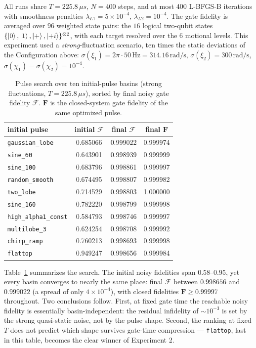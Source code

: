 \documentclass{simple-notes}
\newcommand{\closef}{\mathbf{F}}
\newcommand{\openf}{\mathcal{F}}
\begin{document}
All runs share $T = 225.8\,\mu s$, $N = 400$ steps, and at most $400$ L-BFGS-B iterations with smoothness penalties $\lambda_{L1} = 5\times 10^{-4}$, $\lambda_{L2} = 10^{-4}$. The gate fidelity is averaged over $96$ weighted state pairs: the $16$ logical two-qubit states $\{\ket 0, \ket 1, \ket +, \ket{+i}\}^{\otimes 2}$, with each target resolved over the $6$ motional levels. This experiment used a \emph{strong}-fluctuation scenario, ten times the static deviations of the Configuration above: $\sigma(\xi_1) = 2\pi\cdot 50\,\mathrm{Hz} = 314.16\,\mathrm{rad/s}$, $\sigma(\xi_2) = 300\,\mathrm{rad/s}$, $\sigma(\chi_1)=\sigma(\chi_2)=10^{-4}$.

\begin{table}[htbp]
    \centering
    \begin{tabular}{lccc}
        \hline
        initial pulse & initial $\openf$ & final $\openf$ & final $\closef$ \\
        \hline
        \texttt{gaussian\_lobe}     & 0.685066 & 0.999022 & 0.999974 \\
        \texttt{sine\_60}           & 0.643901 & 0.998939 & 0.999999 \\
        \texttt{sine\_100}          & 0.683796 & 0.998861 & 0.999997 \\
        \texttt{random\_smooth}     & 0.674495 & 0.998807 & 0.999982 \\
        \texttt{two\_lobe}          & 0.714529 & 0.998803 & 1.000000 \\
        \texttt{sine\_160}          & 0.782220 & 0.998799 & 0.999998 \\
        \texttt{high\_alpha1\_const}& 0.584793 & 0.998746 & 0.999997 \\
        \texttt{multilobe\_3}       & 0.624254 & 0.998708 & 0.999992 \\
        \texttt{chirp\_ramp}        & 0.760213 & 0.998693 & 0.999998 \\
        \texttt{flattop}            & 0.949247 & 0.998656 & 0.999984 \\
        \hline
    \end{tabular}
    \caption{Pulse search over ten initial-pulse basins (strong fluctuations, $T = 225.8\,\mu s$), sorted by final noisy gate fidelity $\openf$. $\closef$ is the closed-system gate fidelity of the same optimized pulse.}
    \label{tab:exp1-search}
\end{table}

Table~\ref{tab:exp1-search} summarizes the search. The initial noisy fidelities span $0.58$--$0.95$, yet every basin converges to nearly the same place: final $\openf$ between $0.998656$ and $0.999022$ (a spread of only $4\times10^{-4}$), with closed fidelities $\closef \geq 0.99997$ throughout. Two conclusions follow. First, at fixed gate time the reachable noisy fidelity is essentially basin-independent: the residual infidelity of $\sim 10^{-3}$ is set by the strong quasi-static noise, not by the pulse shape. Second, the ranking at fixed $T$ does not predict which shape survives gate-time compression --- \texttt{flattop}, last in this table, becomes the clear winner of Experiment 2.
\end{document}
